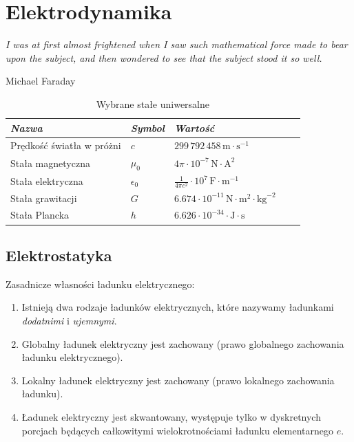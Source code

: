 \documentclass[../main.tex]{subfiles}
\begin{document}
\section{Elektrodynamika}
\textit{I was at first almost frightened when I saw such mathematical force made to bear upon the subject, and then wondered to see that the subject stood it so well.} \begin{flushright}Michael Faraday
\end{flushright}
\begin{table}[h]
    \centering
    \begin{tabular}{ *5l }    \toprule
    \emph{Nazwa} & \emph{Symbol} & \emph{Wartość}  \\\midrule
    Prędkość światła w próżni    & \(c\)  & \(299\,792\,458\,\text{m}\cdot\text{s}^{-1}\)   \\ 
    Stała magnetyczna  & \(\mu_0\) & \(4\pi\cdot 10^{-7}\,\text{N}\cdot\text{A}^2\)  \\ 
    Stała elektryczna  & \(\epsilon_0\) & \(\frac{1}{4\pi c^2}\cdot 10^{7}\,\text{F}\cdot\text{m}^{-1}\)  \\
    Stała grawitacji     & \(G\)  & \(6.674\cdot 10^{-11}\,\text{N}\cdot\text{m}^2\cdot\text{kg}^{-2}\)   \\ 
    Stała Plancka  & \(h\) & \(6.626\cdot 10^{-34}\cdot \text{J}\cdot\text{s}\)\\ 
    \bottomrule
    \hline
\end{tabular}
\caption{Wybrane stałe uniwersalne}
\end{table}


\subsection{Elektrostatyka}
Zasadnicze własności ładunku elektrycznego:
\begin{enumerate}
    \item Istnieją dwa rodzaje ładunków elektrycznych, które nazywamy ładunkami \textit{dodatnimi} i \textit{ujemnymi}.
    \item Globalny ładunek elektryczny jest zachowany (prawo globalnego zachowania ładunku elektrycznego).
    \item Lokalny ładunek elektryczny jest zachowany (prawo lokalnego zachowania ładunku).
    \item Ładunek elektryczny jest skwantowany, występuje tylko w dyskretnych porcjach będących całkowitymi wielokrotnościami ładunku elementarnego \(e\).
\end{enumerate}
\end{document}

